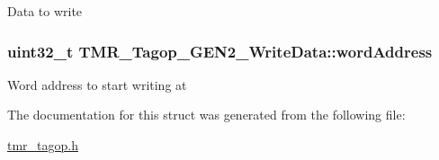 Data to write \hypertarget{struct_t_m_r___tagop___g_e_n2___write_data_ed7370d6ddc9795414fb833287232fc1}{
\subsubsection[{wordAddress}]{\setlength{\rightskip}{0pt plus 5cm}uint32\_\-t {\bf TMR\_\-Tagop\_\-GEN2\_\-WriteData::wordAddress}}}
\label{struct_t_m_r___tagop___g_e_n2___write_data_ed7370d6ddc9795414fb833287232fc1}


Word address to start writing at 

The documentation for this struct was generated from the following file:\begin{CompactItemize}
\item 
\hyperlink{tmr__tagop_8h}{tmr\_\-tagop.h}\end{CompactItemize}

